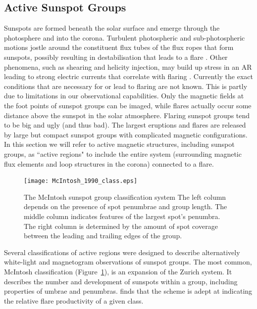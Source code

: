 \subsection{Active Sunspot Groups}\label{intro:flareactreg}

Sunspots are formed beneath the solar surface and emerge through the photosphere and into the corona. Turbulent photospheric and sub-photospheric motions jostle around the constituent flux tubes of the flux ropes that form sunspots, possibly resulting in destabilisation that leads to a flare \citep{Conlon:2010a}. Other phenomena, such as shearing and helicity injection, may build up stress in an AR leading to strong electric currents that correlate with flaring \citep{Schrijver:2005,Schrijver:2007}. 
Currently the exact conditions that are necessary for or lead to flaring are not known. This is partly due to limitations in our observational capabilities. Only the magnetic fields at the foot points of sunspot groups can be imaged, while flares actually occur some distance above the sunspot in the solar atmosphere. Flaring sunspot groups tend to be big and ugly (and thus bad). The largest eruptions and flares are released by large but compact sunspot groups with complicated magnetic configurations. In this section we will refer to active magnetic structures, including sunspot groups, as ``active regions" to include the entire system (surrounding magnetic flux elements and loop structures in the corona) connected to a flare.

\begin{figure}[!t]
\centerline{\texttt{[image: McIntosh\_1990\_class.eps]}}
\caption[The McIntosh sunspot group classification system.]{The McIntosh sunspot group classification system \citep[from][]{McIntosh:1990} The left column depends on the presence of spot penumbrae and group length. The middle column indicates features of the largest spot's penumbra. The right column is determined by the amount of spot coverage between the leading and trailing edges of the group.}
\label{fig:mcintoshclass}
\end{figure}

Several classifications of active regions were designed to describe alternatively white-light and magnetogram observations of sunspot groups. The most common, McIntosh classification (Figure~\ref{fig:mcintoshclass}), is an expansion of the Zurich system. It describes the number and development of sunspots within a group, including properties of umbrae and \glspl{penumbra}. \cite{McIntosh:1990} finds that the scheme is adept at indicating the relative flare productivity of a given class. 

